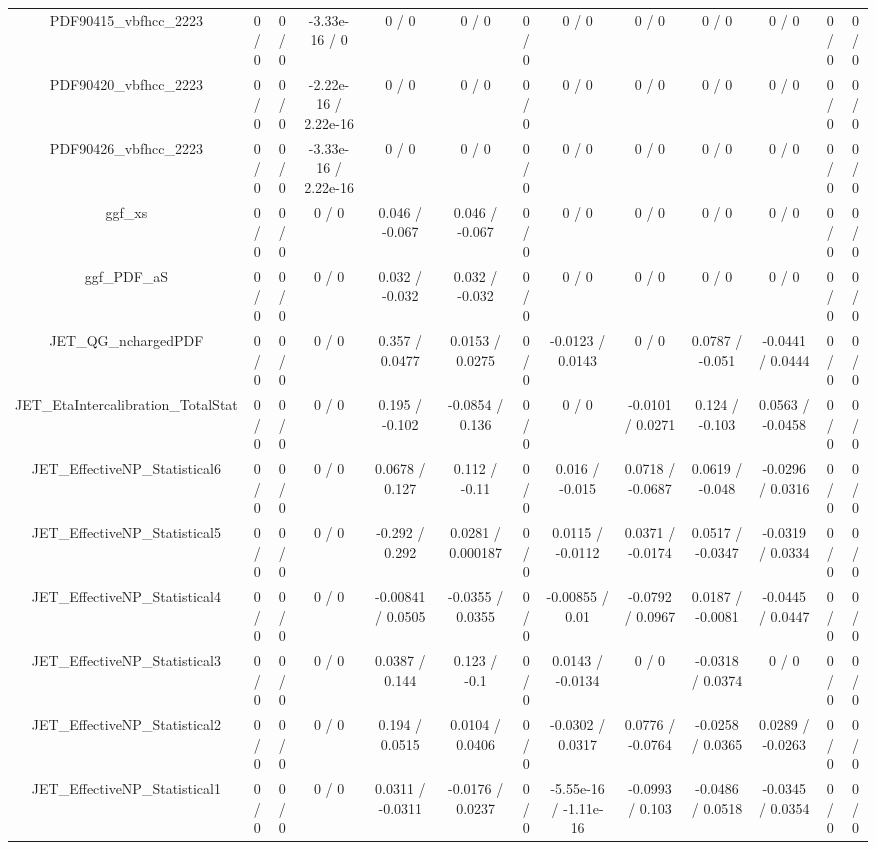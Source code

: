 \documentclass[10pt]{article}
\begin{document}
\begin{table}[htbp]
\begin{center}
\begin{tabular}{|c|c|c|c|c|c|c|c|c|c|c|c|c|}
  PDF90415_vbfhcc_2223 & 0 / 0 & 0 / 0 & -3.33e-16 / 0 & 0 / 0 & 0 / 0 & 0 / 0 & 0 / 0 & 0 / 0 & 0 / 0 & 0 / 0 & 0 / 0 & 0 / 0 \\ 
  PDF90420_vbfhcc_2223 & 0 / 0 & 0 / 0 & -2.22e-16 / 2.22e-16 & 0 / 0 & 0 / 0 & 0 / 0 & 0 / 0 & 0 / 0 & 0 / 0 & 0 / 0 & 0 / 0 & 0 / 0 \\ 
  PDF90426_vbfhcc_2223 & 0 / 0 & 0 / 0 & -3.33e-16 / 2.22e-16 & 0 / 0 & 0 / 0 & 0 / 0 & 0 / 0 & 0 / 0 & 0 / 0 & 0 / 0 & 0 / 0 & 0 / 0 \\ 
  ggf_xs & 0 / 0 & 0 / 0 & 0 / 0 & 0.046 / -0.067 & 0.046 / -0.067 & 0 / 0 & 0 / 0 & 0 / 0 & 0 / 0 & 0 / 0 & 0 / 0 & 0 / 0 \\ 
  ggf_PDF_aS & 0 / 0 & 0 / 0 & 0 / 0 & 0.032 / -0.032 & 0.032 / -0.032 & 0 / 0 & 0 / 0 & 0 / 0 & 0 / 0 & 0 / 0 & 0 / 0 & 0 / 0 \\ 
  JET_QG_nchargedPDF & 0 / 0 & 0 / 0 & 0 / 0 & 0.357 / 0.0477 & 0.0153 / 0.0275 & 0 / 0 & -0.0123 / 0.0143 & 0 / 0 & 0.0787 / -0.051 & -0.0441 / 0.0444 & 0 / 0 & 0 / 0 \\ 
  JET_EtaIntercalibration_TotalStat & 0 / 0 & 0 / 0 & 0 / 0 & 0.195 / -0.102 & -0.0854 / 0.136 & 0 / 0 & 0 / 0 & -0.0101 / 0.0271 & 0.124 / -0.103 & 0.0563 / -0.0458 & 0 / 0 & 0 / 0 \\ 
  JET_EffectiveNP_Statistical6 & 0 / 0 & 0 / 0 & 0 / 0 & 0.0678 / 0.127 & 0.112 / -0.11 & 0 / 0 & 0.016 / -0.015 & 0.0718 / -0.0687 & 0.0619 / -0.048 & -0.0296 / 0.0316 & 0 / 0 & 0 / 0 \\ 
  JET_EffectiveNP_Statistical5 & 0 / 0 & 0 / 0 & 0 / 0 & -0.292 / 0.292 & 0.0281 / 0.000187 & 0 / 0 & 0.0115 / -0.0112 & 0.0371 / -0.0174 & 0.0517 / -0.0347 & -0.0319 / 0.0334 & 0 / 0 & 0 / 0 \\ 
  JET_EffectiveNP_Statistical4 & 0 / 0 & 0 / 0 & 0 / 0 & -0.00841 / 0.0505 & -0.0355 / 0.0355 & 0 / 0 & -0.00855 / 0.01 & -0.0792 / 0.0967 & 0.0187 / -0.0081 & -0.0445 / 0.0447 & 0 / 0 & 0 / 0 \\ 
  JET_EffectiveNP_Statistical3 & 0 / 0 & 0 / 0 & 0 / 0 & 0.0387 / 0.144 & 0.123 / -0.1 & 0 / 0 & 0.0143 / -0.0134 & 0 / 0 & -0.0318 / 0.0374 & 0 / 0 & 0 / 0 & 0 / 0 \\ 
  JET_EffectiveNP_Statistical2 & 0 / 0 & 0 / 0 & 0 / 0 & 0.194 / 0.0515 & 0.0104 / 0.0406 & 0 / 0 & -0.0302 / 0.0317 & 0.0776 / -0.0764 & -0.0258 / 0.0365 & 0.0289 / -0.0263 & 0 / 0 & 0 / 0 \\ 
  JET_EffectiveNP_Statistical1 & 0 / 0 & 0 / 0 & 0 / 0 & 0.0311 / -0.0311 & -0.0176 / 0.0237 & 0 / 0 & -5.55e-16 / -1.11e-16 & -0.0993 / 0.103 & -0.0486 / 0.0518 & -0.0345 / 0.0354 & 0 / 0 & 0 / 0 \\ 

\end{tabular}
\end{center}
\end{table}
\end{document}
